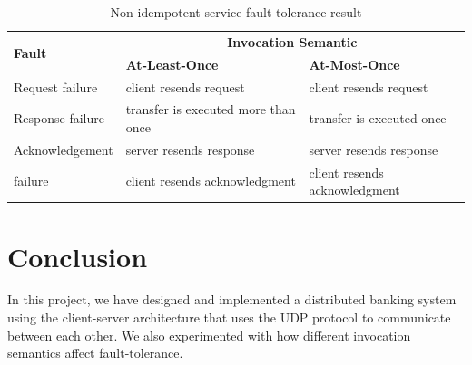 \documentclass[12pt]{article}
\begin{document}
\begin{table}[htbp!]
    \centering
    \caption{Non-idempotent service fault tolerance result}
    \label{table:nonidempotent_experiment}
    \begin{tabularx}{\textwidth}{X l l}
        \toprule
        \multirow{2}{*}{\textbf{Fault}} & \multicolumn{2}{c}{\textbf{Invocation Semantic}} \\
        \cmidrule{2-3}
        & \textbf{At-Least-Once} & \textbf{At-Most-Once} \\ 
        \midrule
       	Request failure & client resends request  & client resends request \\ 
    	\hline
    	Response failure & transfer is executed more than once                                                              & transfer is executed once \\ 
    	\hline
    	Acknowledgement & server resends response & server resends response \\
        failure & client resends acknowledgment & client resends acknowledgment \\ 
        \bottomrule
    \end{tabularx}
\end{table}

\pagebreak
\section{Conclusion}

In this project, we have designed and implemented a distributed banking system using the client-server architecture that uses the UDP protocol to communicate between each other. We also experimented with how different invocation semantics affect fault-tolerance.
\end{document}
